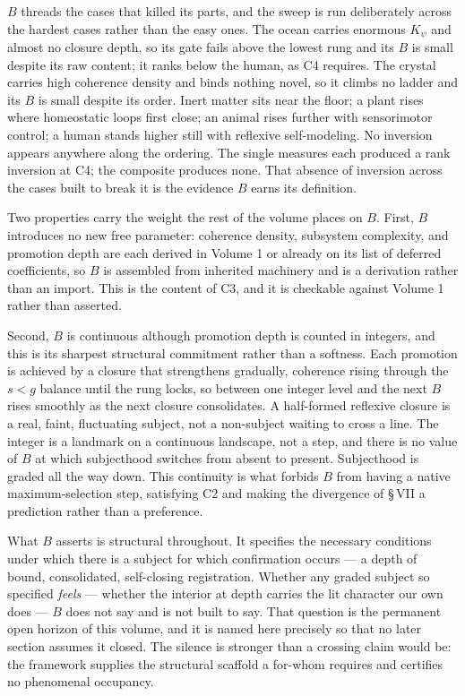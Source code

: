 \documentclass[11pt,oneside]{report}
\theoremstyle{definition}
\theoremstyle{remark}
\begin{document}
\ensuremath{B} threads the cases that killed its parts, and the sweep is
run deliberately across the hardest cases rather than the easy ones. The
ocean carries enormous \ensuremath{K_{\psi}} and almost no closure depth,
so its gate fails above the lowest rung and its \ensuremath{B} is small
despite its raw content; it ranks below the human, as C4 requires. The
crystal carries high coherence density and binds nothing novel, so it
climbs no ladder and its \ensuremath{B} is small despite its order. Inert
matter sits near the floor; a plant rises where homeostatic loops first
close; an animal rises further with sensorimotor control; a human stands
higher still with reflexive self-modeling. No inversion appears anywhere
along the ordering. The single measures each produced a rank inversion at
C4; the composite produces none. That absence of inversion across the
cases built to break it is the evidence \ensuremath{B} earns its
definition.

Two properties carry the weight the rest of the volume places on
\ensuremath{B}. First, \ensuremath{B} introduces no new free parameter:
coherence density, subsystem complexity, and promotion depth are each
derived in Volume 1 or already on its list of deferred coefficients, so
\ensuremath{B} is assembled from inherited machinery and is a derivation
rather than an import. This is the content of C3, and it is checkable
against Volume 1 rather than asserted.

Second, \ensuremath{B} is continuous although promotion depth is counted
in integers, and this is its sharpest structural commitment rather than a
softness. Each promotion is achieved by a closure that strengthens
gradually, coherence rising through the \ensuremath{s < g} balance until
the rung locks, so between one integer level and the next \ensuremath{B}
rises smoothly as the next closure consolidates. A half-formed reflexive
closure is a real, faint, fluctuating subject, not a non-subject waiting
to cross a line. The integer is a landmark on a continuous landscape, not
a step, and there is no value of \ensuremath{B} at which subjecthood
switches from absent to present. Subjecthood is graded all the way down.
This continuity is what forbids \ensuremath{B} from having a native
maximum-selection step, satisfying C2 and making the divergence of \S\,VII
a prediction rather than a preference.

What \ensuremath{B} asserts is structural throughout. It specifies the
necessary conditions under which there is a subject for which confirmation
occurs --- a depth of bound, consolidated, self-closing registration.
Whether any graded subject so specified \emph{feels} --- whether the
interior at depth carries the lit character our own does ---
\ensuremath{B} does not say and is not built to say. That question is the
permanent open horizon of this volume, and it is named here precisely so
that no later section assumes it closed. The silence is stronger than a
crossing claim would be: the framework supplies the structural scaffold a
for-whom requires and certifies no phenomenal occupancy.
\end{document}
